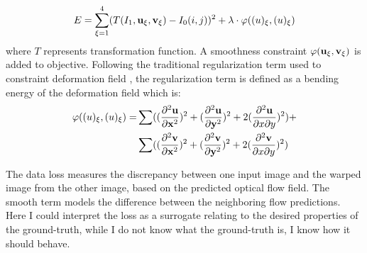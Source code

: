 \documentclass{iitthesis}
\begin{document}
\begin{equation}
E = \sum_{\xi = 1}^4(T(I_1, \bold{u}_{\xi}, \bold{v}_{\xi})-I_0(i, j))^2 + \lambda\cdot\varphi(\bold(u)_{\xi}, \bold(u)_{\xi})
\end{equation}
where $T$ represents transformation function. A smoothness constraint $\varphi(\bold{u}_{\xi}, \bold{v}_{\xi})$ is added to objective. Following the traditional regularization term used to constraint deformation field \cite{rohlfing2003volume}\cite{ashburner1999nonlinear}, the regularization term is defined as a bending energy of the deformation field which is:
\begin{align*}
\varphi(\bold(u)_{\xi}, \bold(u)_{\xi}) = & \sum ((\frac{\partial^2\bold{u}}{\partial \bold{x}^2})^2+(\frac{\partial^2\bold{u}}{\partial \bold{y}^2})^2+2(\frac{\partial^2\bold{u}}{\partial x \partial y})^2) + \\ 
& \sum ((\frac{\partial^2\bold{v}}{\partial \bold{x}^2})^2+(\frac{\partial^2\bold{v}}{\partial \bold{y}^2})^2+2(\frac{\partial^2\bold{v}}{\partial x \partial y})^2)
\end{align*}

The data loss measures the discrepancy between one input image and the warped image from the other image, based on the predicted optical flow field. The smooth term models the difference between the neighboring flow predictions. Here I could interpret the loss as a surrogate relating to the desired properties of the ground-truth, while I do not know what the ground-truth is, I know how it should behave.
\end{document}
